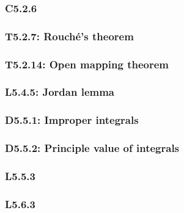 \documentclass{article}
\begin{document}
\begin{multicols*}{3}
\subsubsection*{C5.2.6}

\subsubsection*{T5.2.7: Rouch\'e's theorem}

\subsubsection*{T5.2.14: Open mapping theorem}

\newcolumn

\subsubsection*{L5.4.5: Jordan lemma}

\newcolumn

\subsubsection*{D5.5.1: Improper integrals}

\subsubsection*{D5.5.2: Principle value of integrals}

\subsubsection*{L5.5.3}

\newcolumn

\subsubsection*{L5.6.3}

\end{multicols*}
\end{document}
